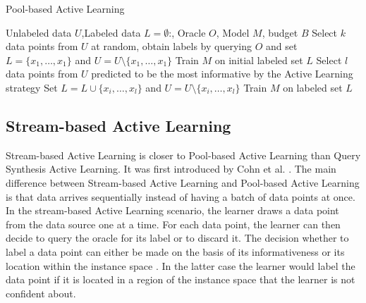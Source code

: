 \begin{algorithm}
    \caption{Pool-based Active Learning} \label{alg:PoolBasedActiveLearning}
    \begin{algorithmic}[1]
        \Require Unlabeled data $U$,Labeled data $L = \emptyset$:, Oracle $O$, Model $M$, budget $B$
        \State Select $k$ data points from $U$ at random, obtain labels by querying $O$ and set $L=\{x_1,\ldots,x_1\}$
        and $U = U \setminus \{x_1,\ldots,x_1\}$ 
        \State Train $M$ on initial labeled set $L$
            \State Select $l$ data points from $U$ predicted to be the most informative by the Active Learning strategy
            \State Set $L= L \cup \{x_i,\ldots,x_l\}$ and $U = U \setminus \{x_i,\ldots,x_l\}$
            \State Train $M$ on labeled set $L$
        \EndWhile
    \end{algorithmic}
\end{algorithm}

\subsection{Stream-based Active Learning}
\label{sec:StreamBasedActiveLearning}
Stream-based Active Learning is closer to Pool-based Active Learning than Query Synthesis Active Learning. It was first introduced by Cohn et al. 
\cite{cohn1994improving}. The main difference between Stream-based Active Learning and Pool-based Active Learning is that data arrives sequentially
instead of having a batch of data points at once. In the stream-based Active Learning scenario, the learner draws a data point from the data source
one at a time. For each data point, the learner can then decide to query the oracle for its label or to discard it. The decision whether to label a
data point can either be made on the basis of its informativeness \cite{dagan1995committee} or its location within the instance space \cite{cohn1994improving}.
In the latter case the learner would label the data point if it is located in a region of the instance space that the learner is not confident about.

